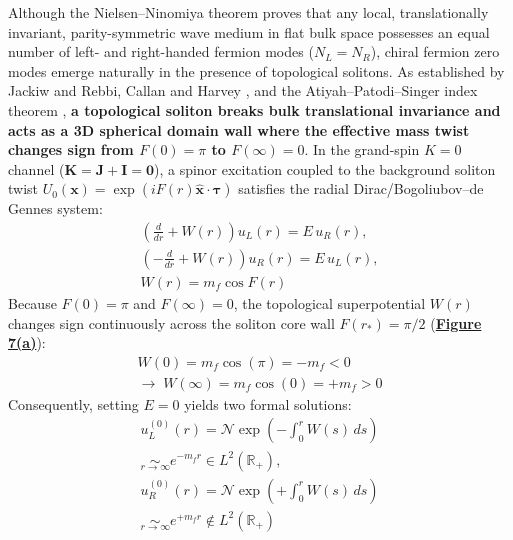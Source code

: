 \documentclass[10pt,aps,prd,twocolumn,superscriptaddress,nofootinbib,floatfix,longbibliography,showkeys]{revtex4-2}
\begin{document}
Although the Nielsen--Ninomiya theorem \cite{ref53} proves that any local, translationally invariant, parity-symmetric wave medium in flat bulk space possesses an equal number of left- and right-handed fermion modes ($N_L = N_R$), chiral fermion zero modes emerge naturally in the presence of topological solitons. As established by Jackiw and Rebbi, Callan and Harvey \cite{ref35,ref36}, and the Atiyah--Patodi--Singer index theorem \cite{ref37}, \textbf{a topological soliton breaks bulk translational invariance and acts as a 3D spherical domain wall where the effective mass twist changes sign from $F(0) = \pi$ to $F(\infty) = 0$}. In the grand-spin $K = 0$ channel ($\mathbf{K} = \mathbf{J} + \mathbf{I} = \mathbf{0}$), a spinor excitation coupled to the background soliton twist $U_0(\mathbf{x}) = \exp(i F(r)\hat{\mathbf{x}}\cdot\boldsymbol{\tau})$ satisfies the radial Dirac/Bogoliubov--de Gennes system:
\begin{equation}\begin{gathered}
\left(\frac{d}{dr} + W(r)\right) u_L(r) = E\,u_R(r), \\
\left(-\frac{d}{dr} + W(r)\right) u_R(r) = E\,u_L(r), \\
W(r) = m_f \cos F(r)
\end{gathered}\end{equation}
Because $F(0) = \pi$ and $F(\infty) = 0$, the topological superpotential $W(r)$ changes sign continuously across the soliton core wall $F(r_*) = \pi/2$ (\textbf{\hyperref[fig:fig7]{Figure 7(a)}}):
\begin{multline}
W(0) = m_f \cos(\pi) = -m_f < 0 \\
\rightarrow \; W(\infty) = m_f \cos(0) = +m_f > 0
\end{multline}
Consequently, setting $E = 0$ yields two formal solutions:
\begin{equation}\begin{gathered}
u_L^{(0)}(r) = \mathcal{N}\exp\!\left(-\int_0^r W(s)\,ds\right) \\
\underset{r\to\infty}{\sim} e^{-m_f r} \in L^2(\mathbb{R}_+), \\
u_R^{(0)}(r) = \mathcal{N}\exp\!\left(+\int_0^r W(s)\,ds\right) \\
\underset{r\to\infty}{\sim} e^{+m_f r} \notin L^2(\mathbb{R}_+)
\end{gathered}\end{equation}
\end{document}
